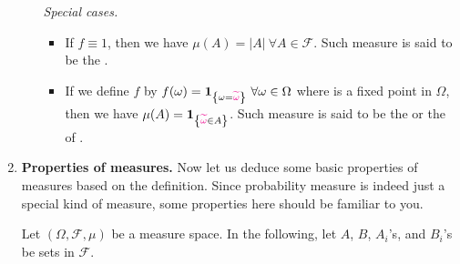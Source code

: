 \begin{enumerate}
\begin{enumerate}
\emph{Special cases.}
\begin{itemize}
\item If \(f\equiv 1\), then we have \(\mu(A)=|A|~\forall A\in\mathcal{F}\).
Such measure is said to be the .
\item If we define \(f\) by
\(f(\omega)=\indicset{\omega=\mgc{\widetilde{\omega}}}~\forall \omega\in\Omega\)
where \mgc{\(\widetilde{\omega}\)} is a fixed point in \(\Omega\), then we have
\(\mu(A)=\indicset{\mgc{\widetilde{\omega}}\in A}\). Such measure is said to be the
 or the  of \mgc{\(\widetilde{\omega}\)}.
\end{itemize}
\end{enumerate}
\item \label{it:meas-prop} \textbf{Properties of measures.} Now let us deduce
some basic properties of measures based on the definition. Since probability
measure is indeed just a special kind of measure, some properties here should
be familiar to you.

Let \((\Omega,\mathcal{F},\mu)\) be a measure space.  In the following, let
\(A\), \(B\), \(A_i\)'s, and \(B_i\)'s be sets in \(\mathcal{F}\).


\end{enumerate}
